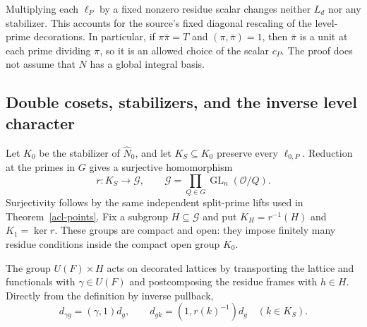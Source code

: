 Multiplying each $\ell_P$ by a fixed nonzero residue scalar
changes neither $L_d$ nor any stabilizer. This accounts for the
source's fixed diagonal rescaling of the level-prime decorations.
In particular, if $\pi\bar\pi=T$ and $(\pi,\bar\pi)=1$, then
$\bar\pi$ is a unit at each prime dividing $\pi$, so it is an
allowed choice of the scalar $c_P$. The proof does not assume
that $N$ has a global integral basis.

\subsection{Double cosets, stabilizers, and the inverse level character}

Let $K_0$ be the stabilizer of $\widehat N_0$, and let
$K_S\subseteq K_0$ preserve every $\ell_{0,P}$.
Reduction at the primes in $G$ gives a surjective homomorphism
\[
       r:K_S\longrightarrow\mathcal G,
       \qquad \mathcal G=\prod_{Q\in G}
                                \operatorname{GL}_n(\mathcal O/Q).
\]
Surjectivity follows by the same independent split-prime lifts
used in Theorem~\ref{acl-points}. Fix a subgroup $H\subseteq\mathcal G$
and put $K_H=r^{-1}(H)$ and $K_1=\ker r$.
These groups are compact and open: they impose finitely many
residue conditions inside the compact open group $K_0$.

The group $U(F)\times H$ acts on decorated lattices by
transporting the lattice and functionals with $\gamma\in U(F)$
and postcomposing the residue frames with $h\in H$.
Directly from the definition by inverse pullback,
\begin{equation}\label{acl-action}
 d_{\gamma g}=(\gamma,1)d_g,
 \qquad d_{gk}=(1,r(k)^{-1})d_g\quad(k\in K_S).
\end{equation}

